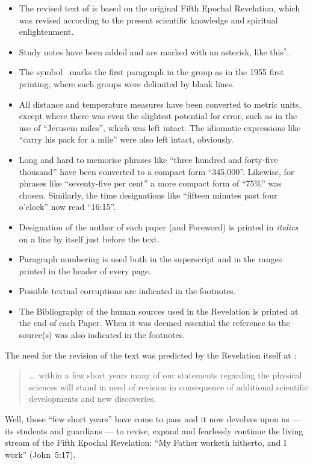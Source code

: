 \begin{itemize}
\item The revised text of  is based on the original Fifth Epochal Revelation,
which was revised according to the present scientific knowledge and spiritual enlightenment.
\item Study notes have been added and are marked with an asterisk, like this$^*$.
\item The symbol \pc\ marks the first paragraph in the group as in the 1955 first printing, where such groups were delimited by blank lines.
\item All distance and temperature measures have been converted to metric units, except where there was even the slightest potential for error, such as in the use of ``Jerusem miles'', which was left intact. The idiomatic expressions like ``carry his pack for a mile'' were also left intact, obviously.
\item Long and hard to memorise phrases like ``three hundred and forty\hyp{}five thousand'' have been converted to a compact form ``345,000''. Likewise, for phrases like ``seventy\hyp{}five per cent'' a more compact form of ``75\%'' was chosen. Similarly, the time designations like ``fifteen minutes past four o’clock'' now read ``16:15''.
\item Designation of the author of each paper (and Foreword) is printed in \textit{italics} on a line by itself just before the text.
\item Paragraph numbering is used both in the superscript and in the ranges printed in the head\-er of every page.
\item Possible textual corruptions are indicated in the footnotes.
\item The Bibliography of the human sources used in the Revelation is printed at the end of each Paper.
      When it was deemed essential the reference to the source(s) was also indicated in the footnotes.
\end{itemize}

The need for the revision of the text was predicted by the Revelation itself at :
\begin{quote}
\ldots\ within a few short years many of our statements regarding the physical sciences will stand in need of revision in consequence of additional scientific developments and new discoveries.
\end{quote}
Well, those ``few short years'' have come to pass and it now devolves upon us --- its students and guardians --- to revise,
expand and fearlessly continue the living stream of the Fifth Epochal Revelation:
``My Father worketh hitherto, and I work'' (John~5:17).

